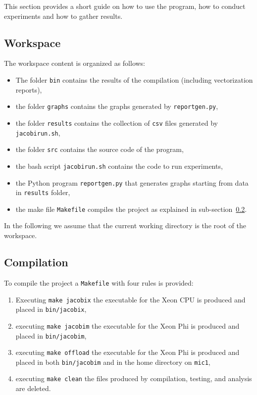 This section provides a short guide on how to use the program, how to conduct experiments and how to gather results.

\subsection{Workspace}
The workspace content is organized as follows:
\begin{itemize}
	\item The folder \verb|bin| contains the results of the compilation (including vectorization reports),
	\item the folder \verb|graphs| contains the graphs generated by \verb|reportgen.py|,
	\item the folder \verb|results| contains the collection of \verb|csv| files generated by \verb|jacobirun.sh|,
	\item the folder \verb|src| contains the source code of the program,
	\item the bash script \verb|jacobirun.sh| contains the code to run experiments,
	\item the Python program \verb|reportgen.py| that generates graphs starting from data in \verb|results| folder,
	\item the make file \verb|Makefile| compiles the project as explained in sub-section~\ref{subsec:compilation}.
\end{itemize}

In the following we assume that the current working directory is the root of the workspace.

\subsection{Compilation}\label{subsec:compilation}
To compile the project a \verb|Makefile| with four rules is provided:
\begin{enumerate}
	\item Executing \verb|make jacobix| the executable for the Xeon CPU is produced and placed in \verb|bin/jacobix|,
	\item executing \verb|make jacobim| the executable for the Xeon Phi is produced and placed in \verb|bin/jacobim|,
	\item executing \verb|make offload| the executable for the Xeon Phi is produced and placed in both \verb|bin/jacobim| and in the home directory on \verb|mic1|,
	\item executing \verb|make clean| the files produced by compilation, testing, and analysis are deleted.
\end{enumerate}

